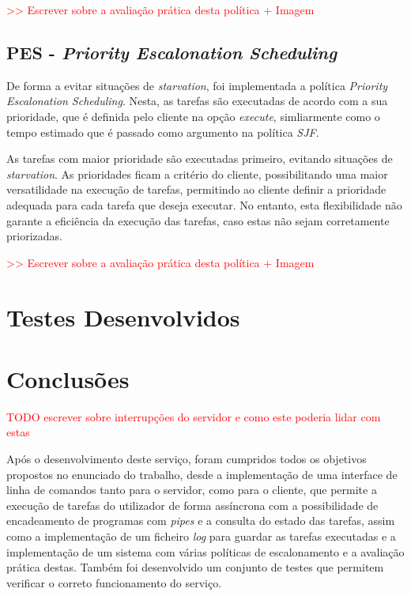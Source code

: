 \documentclass[a4paper,11pt]{scrreprt}
\begin{document}
        \textcolor{red}{>> Escrever sobre a avaliação prática desta política + Imagem}
    \section{\textbf{PES} - \textit{Priority Escalonation Scheduling}}
        De forma a evitar situações de \textit{starvation}, foi implementada a política
        \textit{Priority Escalonation Scheduling}. Nesta, as tarefas são executadas
        de acordo com a sua prioridade, que é definida pelo cliente na opção \textit{execute},
        simliarmente como o tempo estimado que é passado como argumento na política \textit{SJF}.

        As tarefas com maior prioridade são executadas primeiro, evitando
        situações de \textit{starvation}. As prioridades ficam a critério do cliente,
        possibilitando uma maior versatilidade na execução de tarefas, permitindo ao cliente
        definir a prioridade adequada para cada tarefa que deseja executar. No entanto, esta
        flexibilidade não garante a eficiência da execução das tarefas, caso estas não sejam
        corretamente priorizadas.

        \textcolor{red}{>> Escrever sobre a avaliação prática desta política + Imagem}

\chapter{Testes Desenvolvidos}


\chapter{Conclusões}
    \textcolor{red}{TODO escrever sobre interrupções do servidor e como este
    poderia lidar com estas}

    Após o desenvolvimento deste serviço, foram cumpridos todos
    os objetivos propostos no enunciado do trabalho, desde a implementação de
    uma interface de linha de comandos tanto para o servidor, como para o cliente,
    que permite a execução de tarefas do utilizador de forma assíncrona com a
    possibilidade de encadeamento de programas com \textit{pipes} e a
    consulta do estado das tarefas, assim como a implementação de um ficheiro
    \textit{log} para guardar as tarefas executadas e a implementação de um
    sistema com várias políticas de escalonamento e a avaliação prática destas.
    Também foi desenvolvido um conjunto de testes que permitem verificar o correto
    funcionamento do serviço.
\end{document}
